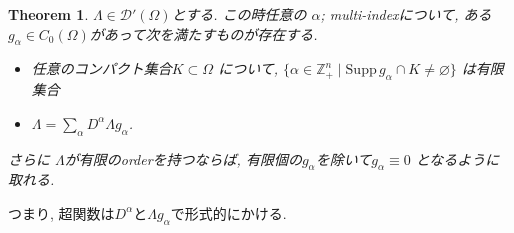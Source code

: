 \documentclass[dvipdfmx,a4paper,11pt]{article} %
\newtheorem{thm}{Theorem}[section]
\theoremstyle{definition}
\theoremstyle{remark}
\numberwithin{equation}{section}
\newcommand{\N}{\mathbb{Z}_+}
\begin{document}
\begin{tcolorbox}[mybox]
\begin{thm}\cite[Theorem 6.28]{Rud}
\label{thm-H-2.6}
\(\Lambda \in \mathcal{D}'(\Omega)\)とする.
この時任意の \(\alpha\); multi-indexについて, ある\(g_\alpha \in C_0(\Omega)\)があって次を満たすものが存在する. 
\begin{itemize}
\item 任意のコンパクト集合\( K \subset \Omega\) について,  \(\{\alpha \in \N^n \mid \mathrm{Supp}\, g_\alpha \cap K \neq \varnothing \}\) は有限集合
\item \(\Lambda = \sum_\alpha D^\alpha \Lambda g_\alpha\).
\end{itemize}
さらに \(\Lambda\)が有限のorderを持つならば, 有限個の$g_{\alpha}$を除いて\(g_\alpha \equiv 0\) となるように取れる. 
\end{thm}
\end{tcolorbox}
つまり, 超関数は$D^\alpha$と$\Lambda g_\alpha$で形式的にかける. 
\end{document}
